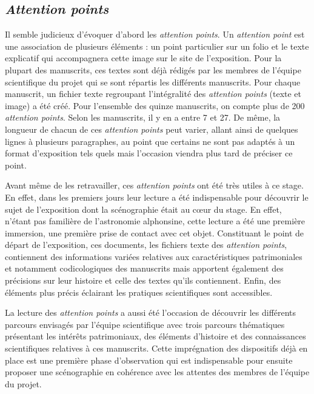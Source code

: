 	\subsection{\textit{Attention points}}
	Il semble judicieux d’évoquer d’abord les \textit{attention points}. Un \textit{attention point} est une association de plusieurs éléments : un point particulier sur un folio et le texte explicatif qui accompagnera cette image sur le site de l’exposition. Pour la plupart des manuscrits, ces textes sont déjà rédigés par les membres de l’équipe scientifique du projet qui se sont répartis les différents manuscrits. Pour chaque manuscrit, un fichier texte regroupant l’intégralité des \textit{attention points} (texte et image) a été créé. Pour l’ensemble des quinze manuscrits, on compte plus de 200 \textit{attention points}. Selon les manuscrits, il y en a entre 7 et 27. De même, la longueur de chacun de ces \textit{attention points} peut varier, allant ainsi de quelques lignes à plusieurs paragraphes, au point que certains ne sont pas adaptés à un format d’exposition tels quels mais l’occasion viendra plus tard de préciser ce point. 
	
	Avant même de les retravailler, ces \textit{attention points} ont été très utiles à ce stage. En effet, dans les premiers jours leur lecture a été indispensable pour découvrir le sujet de l’exposition dont la scénographie était au cœur du stage. En effet, n’étant pas familière de l’astronomie alphonsine, cette lecture a été une première immersion, une première prise de contact avec cet objet. Constituant le point de départ de l’exposition, ces documents, les fichiers texte des \textit{attention points}, contiennent des informations variées relatives aux caractéristiques patrimoniales et notamment codicologiques des manuscrits mais apportent également des précisions sur leur histoire et celle des textes qu’ils contiennent. Enfin, des éléments plus précis éclairant les pratiques scientifiques sont accessibles.
	
	La lecture des \textit{attention points} a aussi été l'occasion de découvrir les différents parcours envisagés par l'équipe scientifique avec trois parcours thématiques présentant les intérêts patrimoniaux, des éléments d'histoire et des connaissances scientifiques relatives à ces manuscrits. Cette imprégnation des dispositifs déjà en place est une première phase d'observation qui est indispensable pour ensuite proposer une scénographie en cohérence avec les attentes des membres de l'équipe du projet. 
	
